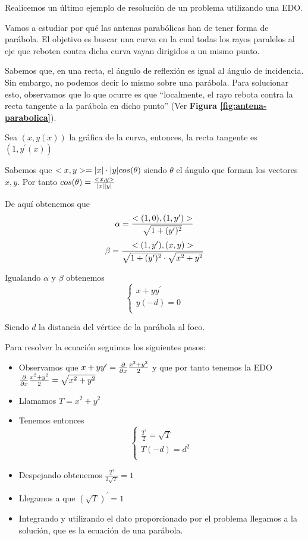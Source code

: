 \documentclass{mathnotes}
\begin{document}
Realicemos un último ejemplo de resolución de un problema utilizando una EDO.

\begin{example}
Vamos a estudiar por qué las antenas parabólicas han de tener forma de parábola. El objetivo es buscar una curva en la cual todas los rayos paralelos al eje que reboten contra dicha curva vayan dirigidos a un mismo punto.

Sabemos que, en una recta, el ángulo de reflexión es igual al ángulo de incidencia. Sin embargo, no podemos decir lo mismo sobre una parábola. Para solucionar esto, observamos que lo que ocurre es que ``localmente, el rayo rebota contra la recta tangente a la parábola en dicho punto'' (Ver \textbf{Figura \ref{fig:antena-parabolica}}).

Sea $(x,y(x))$ la gráfica de la curva, entonces, la recta tangente es $(1, y^\prime(x))$

Sabemos que $<x,y>=|x|\cdot|y|cos(\theta)$ siendo $\theta$ el ángulo que forman los vectores $x,y$. Por tanto $cos(\theta)=\frac{<x,y>}{|x||y|}$

De aquí obtenemos que
$$\alpha = \frac{<(1,0),(1,y^\prime)>}{\sqrt{1+(y^\prime)^2}}$$
$$\beta = \frac{<(1,y^\prime),(x,y)>}{\sqrt{1+(y^\prime)^2}\cdot\sqrt{x^2+y^2}}$$

Igualando $\alpha$ y $\beta$ obtenemos
\begin{equation*}
  \left\lbrace
  \begin{array}{l}
     x+yy^\prime \\
     y(-d) = 0  \\
  \end{array}
  \right.
\end{equation*}

Siendo $d$ la distancia del vértice de la parábola al foco.

Para resolver la ecuación seguimos los siguientes pasos:
\begin{itemize}
\item Observamos que $x+yy^\prime = \frac{\partial}{\partial x}\frac{x^2+y^2}{2}$ y que por tanto tenemos la EDO $\frac{\partial}{\partial x}\frac{x^2+y^2}{2}=\sqrt{x^2+y^2}$
\item Llamamos $T=x^2+y^2$
\item Tenemos entonces
\begin{equation*}
  \left\lbrace
  \begin{array}{l}
     \frac{T^\prime}{2} = \sqrt{T} \\
     T(-d) = d^2  \\
  \end{array}
  \right.
\end{equation*}
\item Despejando obtenemos $\frac{T^\prime}{2\sqrt{T}} = 1$
\item Llegamos a que $(\sqrt{T})^\prime = 1$
\item Integrando y utilizando el dato proporcionado por el problema llegamos a la solución, que es la ecuación de una parábola.
\end{itemize}
\end{example}
\end{document}
